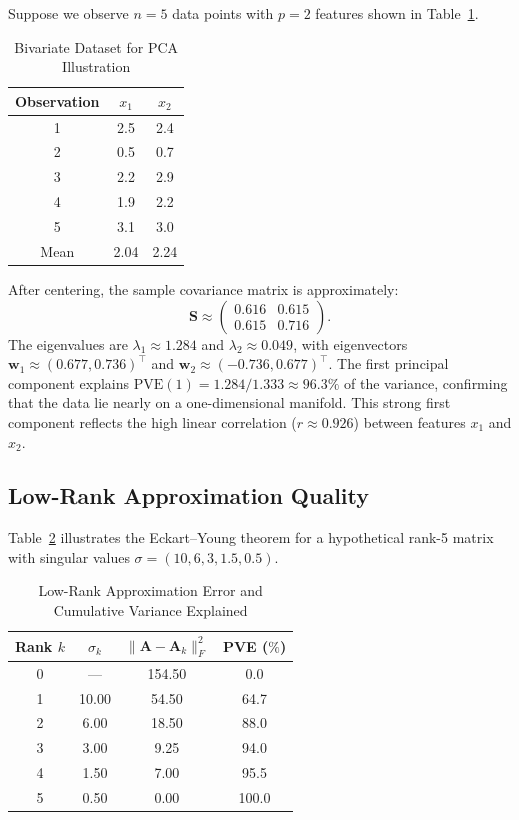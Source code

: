 \documentclass[conference]{IEEEtran}
\begin{document}
Suppose we observe $n = 5$ data points with $p = 2$ features shown in Table~\ref{tab:pca_example}.

\begin{table}[t]
\centering
\caption{Bivariate Dataset for PCA Illustration}
\label{tab:pca_example}
\begin{tabular}{ccc}
\toprule
Observation & $x_1$ & $x_2$ \\
\midrule
1 & 2.5 & 2.4 \\
2 & 0.5 & 0.7 \\
3 & 2.2 & 2.9 \\
4 & 1.9 & 2.2 \\
5 & 3.1 & 3.0 \\
\midrule
Mean & 2.04 & 2.24 \\
\bottomrule
\end{tabular}
\end{table}

After centering, the sample covariance matrix is approximately:
\begin{equation}
\mathbf{S} \approx \begin{pmatrix} 0.616 & 0.615 \\ 0.615 & 0.716 \end{pmatrix}.
\end{equation}
The eigenvalues are $\lambda_1 \approx 1.284$ and $\lambda_2 \approx 0.049$, with eigenvectors $\mathbf{w}_1 \approx (0.677, 0.736)^\top$ and $\mathbf{w}_2 \approx (-0.736, 0.677)^\top$. The first principal component explains $\text{PVE}(1) = 1.284/1.333 \approx 96.3\%$ of the variance, confirming that the data lie nearly on a one-dimensional manifold. This strong first component reflects the high linear correlation ($r \approx 0.926$) between features $x_1$ and $x_2$.

\subsection{Low-Rank Approximation Quality}

Table~\ref{tab:rank_approx} illustrates the Eckart--Young theorem for a hypothetical rank-5 matrix with singular values $\sigma = (10, 6, 3, 1.5, 0.5)$.

\begin{table}[t]
\centering
\caption{Low-Rank Approximation Error and Cumulative Variance Explained}
\label{tab:rank_approx}
\begin{tabular}{cccc}
\toprule
Rank $k$ & $\sigma_k$ & $\|\mathbf{A}-\mathbf{A}_k\|_F^2$ & PVE ($\%$) \\
\midrule
0 & ---   & 154.50 & 0.0 \\
1 & 10.00 & 54.50  & 64.7 \\
2 & 6.00  & 18.50  & 88.0 \\
3 & 3.00  & 9.25   & 94.0 \\  %
4 & 1.50  & 7.00   & 95.5 \\
5 & 0.50  & 0.00   & 100.0 \\
\bottomrule
\end{tabular}
\end{table}
\end{document}
